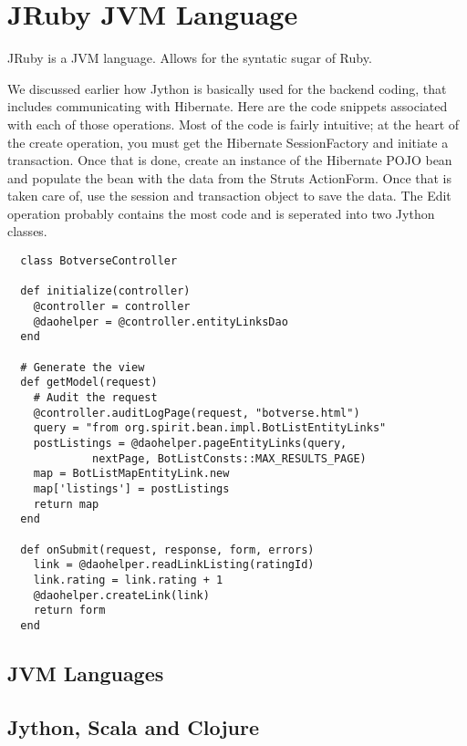 \section{JRuby JVM Language}

JRuby is a JVM language.  Allows for the syntatic sugar of Ruby.

We discussed earlier how Jython is basically used for the backend 
coding, that includes communicating with Hibernate. 
Here are the code snippets associated with each of those operations. 
Most of the code is fairly intuitive; at the heart of the 
create operation, you must get the Hibernate SessionFactory 
and initiate a transaction. Once that is done, 
create an instance of the Hibernate POJO bean and populate 
the bean with the data from the Struts ActionForm. 
Once that is taken care of, use the session and transaction 
object to save the data. The Edit operation probably contains 
the most code and is seperated into two Jython classes.

\begin{verbatim}
  class BotverseController
		
  def initialize(controller)
    @controller = controller
    @daohelper = @controller.entityLinksDao
  end

  # Generate the view
  def getModel(request)  
    # Audit the request
    @controller.auditLogPage(request, "botverse.html")
	query = "from org.spirit.bean.impl.BotListEntityLinks"
	postListings = @daohelper.pageEntityLinks(query, 
	         nextPage, BotListConsts::MAX_RESULTS_PAGE)
	map = BotListMapEntityLink.new    
    map['listings'] = postListings
    return map
  end

  def onSubmit(request, response, form, errors)
    link = @daohelper.readLinkListing(ratingId)    
    link.rating = link.rating + 1
    @daohelper.createLink(link)
    return form
  end

\end{verbatim}

\subsection{JVM Languages}

\subsection{Jython, Scala and Clojure}
